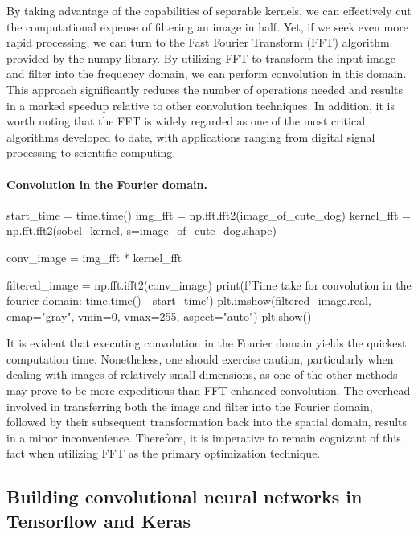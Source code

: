 \documentclass[%
oneside,                 %
final,                   %
10pt]{article}
\begin{document}
\epycod


By taking advantage of the capabilities of separable kernels, we can
effectively cut the computational expense of filtering an image in
half. Yet, if we seek even more rapid processing, we can turn to the
Fast Fourier Transform (FFT) algorithm provided by the numpy
library. By utilizing FFT to transform the input image and filter into
the frequency domain, we can perform convolution in this domain. This
approach significantly reduces the number of operations needed and
results in a marked speedup relative to other convolution
techniques. In addition, it is worth noting that the FFT is widely
regarded as one of the most critical algorithms developed to date,
with applications ranging from digital signal processing to scientific
computing.

\paragraph{Convolution in the Fourier domain.}











\bpycod
start_time = time.time()
img_fft = np.fft.fft2(image_of_cute_dog)
kernel_fft = np.fft.fft2(sobel_kernel, s=image_of_cute_dog.shape)

conv_image = img_fft * kernel_fft

filtered_image = np.fft.ifft2(conv_image)
print(f'Time take for convolution in the fourier domain: {time.time() - start_time}')
plt.imshow(filtered_image.real, cmap="gray", vmin=0, vmax=255, aspect="auto")
plt.show()

\epycod


It is evident that executing convolution in the Fourier domain yields
the quickest computation time. Nonetheless, one should exercise
caution, particularly when dealing with images of relatively small
dimensions, as one of the other methods may prove to be more
expeditious than FFT-enhanced convolution. The overhead involved in
transferring both the image and filter into the Fourier domain,
followed by their subsequent transformation back into the spatial
domain, results in a minor inconvenience. Therefore, it is imperative
to remain cognizant of this fact when utilizing FFT as the primary
optimization technique.

\subsection{Building convolutional neural networks in Tensorflow and Keras}
\end{document}
